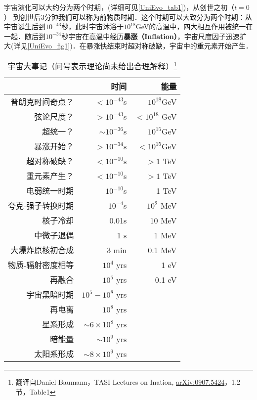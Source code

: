 
宇宙演化可以大约分为两个时期，(详细可见\autoref{UniEvo_tab1})，从创世之初（$t=0$） 到创世后3分钟我们可以称为前物质时期．这个时期可以大致分为两个时期：从宇宙诞生后到$10^{-43}$秒，此时宇宙沐浴于$10^{18}$GeV的高温中，四大相互作用被统一在一起．随后到$10^{-34}$秒宇宙在高温中经历\textbf{暴涨（Inflation）}，宇宙尺度因子迅速扩大(详见\autoref{UniEvo_fig1})．在暴涨快结束时超对称破缺，宇宙中的重元素开始产生．

\begin{table}[ht]
\centering
\caption{宇宙大事记（问号表示理论尚未给出合理解释）\footnote{翻译自Daniel Baumann，TASI Lectures on Ination, \href{https://arxiv.org/abs/0907.5424}{arXiv:0907.5424}，1.2 节，Table1}}\label{UniEvo_tab1}
\begin{tabular}{|r|r|r|}
\hline
 & 时间 & 能量 \\
\hline
普朗克时间奇点？ & $<10^{-43}$s & $10^{18}$GeV \\
\hline
弦论尺度？       & $>10^{-43}$s & $<10^{18}$ GeV \\
\hline
超统一？         & $\sim 10^{-36}$s & $10^{15}$GeV \\
\hline
暴涨开始？       & $>10^{-34}$s & $<10^{15} $GeV \\
\hline
超对称破缺？     & $<10^{-10}$s & $>1$ TeV \\
\hline
重元素产生？     & $<10^{-10}$s & $>1$ TeV \\
\hline
电弱统一时期    & $10^{-10}$s & 1 TeV \\
\hline
夸克-强子转换时期 & $10^{-4}$s & $10^2$ MeV \\
\hline
核子冷却        & 0.01s & 10 MeV \\
\hline
中微子退偶      & 1 s  & 1 MeV \\
\hline
大爆炸原核初合成  & 3 min & 0.1 MeV \\
\hline
物质-辐射密度相等 & $10^4$ yrs  & 1 eV \\
\hline
再融合 & $10^5$ yrs  & 0.1 eV \\
\hline
宇宙黑暗时期 & $10^5 - 10^8$ yrs  &  \\
\hline
再电离 & $10^8$ yrs  &  \\
\hline
星系形成 & $\sim 6 \times 10^8$ yrs  &  \\
\hline
暗能量 & $\sim 10^9$  yrs  &  \\
\hline
太阳系形成 & $ \sim 8 \times 10^9  $ yrs  &  \\
\hline
\end{tabular}
\end{table}

